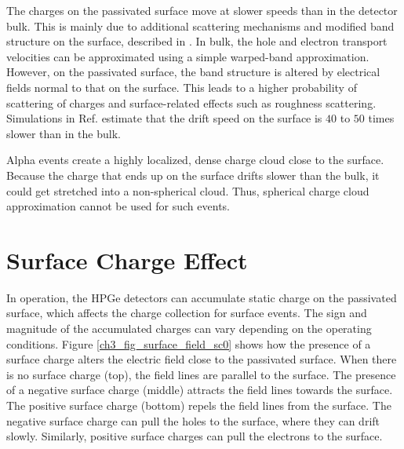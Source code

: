 The charges on the passivated surface move at slower speeds than in the detector bulk. This is mainly due to additional scattering mechanisms and modified band structure on the surface, described in \cite{MULLOWNEY201233}. In bulk, the hole and electron transport velocities can be approximated using a simple warped-band approximation. However, on the passivated surface, the band structure is altered by electrical fields normal to that on the surface. This leads to a higher probability of scattering of charges and surface-related effects such as roughness scattering.  Simulations in Ref. \cite{MULLOWNEY201233} estimate that the drift speed on the surface is $40$ to $50$ times slower than in the bulk. 

Alpha events create a highly localized, dense charge cloud close to the surface. Because the charge that ends up on the surface drifts slower than the bulk, it could get stretched into a non-spherical cloud. Thus, spherical charge cloud approximation cannot be used for such events.

\section{Surface Charge Effect}
In operation, the HPGe detectors can accumulate static charge on the passivated surface, which affects the charge collection for surface events. The sign and magnitude of the accumulated charges can vary depending on the operating conditions. Figure \ref{ch3_fig_surface_field_sc0} shows how the presence of a surface charge alters the electric field close to the passivated surface. When there is no surface charge (top), the field lines are parallel to the surface. The presence of a negative surface charge (middle) attracts the field lines towards the surface. The positive surface charge (bottom) repels the field lines from the surface. The negative surface charge can pull the holes to the surface, where they can drift slowly. Similarly, positive surface charges can pull the electrons to the surface.

